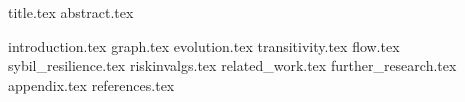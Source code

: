 \documentclass[11pt]{llncs}
\begin{document}
{title.tex}
\thispagestyle{plain}
{abstract.tex}

{introduction.tex}
{graph.tex}
{evolution.tex}
{transitivity.tex}
{flow.tex}
{sybil_resilience.tex}
{riskinvalgs.tex}
{related_work.tex}
{further_research.tex}
{appendix.tex}
{references.tex}
\end{document}
